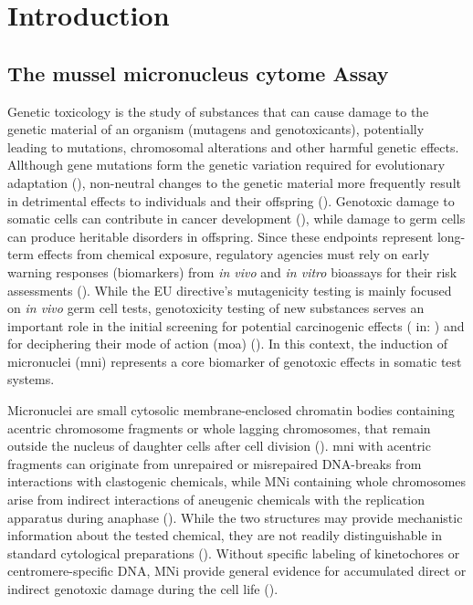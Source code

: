 \chapter{Introduction}
\section{The mussel micronucleus cytome Assay}
Genetic toxicology is the study of substances that can cause damage to the genetic material of an organism (mutagens and genotoxicants), potentially leading to mutations, chromosomal alterations and other harmful genetic effects. Allthough gene mutations form the genetic variation required for evolutionary adaptation (\cite{Harr2005}), non-neutral changes to the genetic material more frequently result in detrimental effects to individuals and their offspring (\cite{Halligan2006}). Genotoxic damage to somatic cells can contribute in cancer development (\cite{Hanahan2011}), while damage to germ cells can produce heritable disorders in offspring. Since these endpoints represent long-term effects from chemical exposure, regulatory agencies must rely on early warning responses (biomarkers) from \emph{in vivo} and \emph{in vitro} bioassays for their risk assessments (\cite{ECHA2017}). While the EU directive's mutagenicity testing is mainly focused on \emph{in vivo} germ cell tests, genotoxicity testing of new substances serves an important role in the initial screening for potential carcinogenic effects (\cite{Broschinski1998} in: \cite{OSPAR2020}) and for deciphering their mode of action (\acrshort{moa}) (\cite{Eastmond2009}). In this context, the induction of micronuclei (\acrshort{mni}) represents a core biomarker of genotoxic effects in somatic test systems.

Micronuclei are small cytosolic membrane-enclosed chromatin bodies containing acentric chromosome fragments or whole lagging chromosomes, that remain outside the nucleus of daughter cells after cell division (\cite{Fenech2011}). \acrshort{mni} with acentric fragments can originate from unrepaired or misrepaired DNA-breaks from interactions with clastogenic chemicals, while MNi containing whole chromosomes arise from indirect interactions of aneugenic chemicals with the replication apparatus during anaphase (\cite{Fenech2011}). While the two structures may provide mechanistic information about the tested chemical, they are not readily distinguishable in standard cytological preparations (\cite{Natarajan1993}). Without specific labeling of kinetochores or centromere-specific DNA, MNi provide general evidence for accumulated direct or indirect genotoxic damage during the cell life (\cite{Tucker1996, Lynch1993}).

